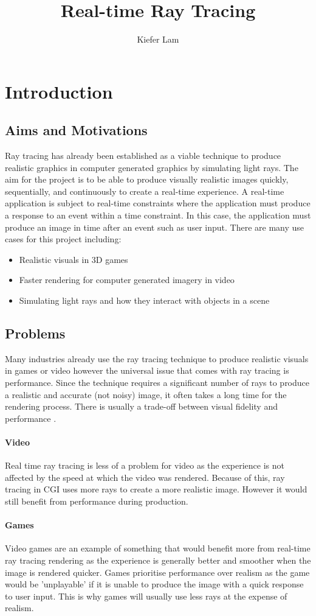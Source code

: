 \documentclass[final]{cmpreport}
\title{Real-time Ray Tracing}
\author{Kiefer Lam}
\begin{document}
\section{Introduction}

\subsection{Aims and Motivations}
Ray tracing has already been established as a viable technique to produce realistic graphics in computer generated graphics by simulating light rays. The aim for the project is to be able to produce visually realistic images quickly, sequentially, and continuously to create a real-time experience. A real-time application is subject to real-time constraints where the application must produce a response to an event within a time constraint. In this case, the application must produce an image in time after an event such as user input. There are many use cases for this project including:

\begin{itemize}
    \item Realistic visuals in 3D games
    \item Faster rendering for computer generated imagery in video
    \item Simulating light rays and how they interact with objects in a scene
\end{itemize}

\subsection{Problems}
Many industries already use the ray tracing technique to produce realistic visuals in games or video however the universal issue that comes with ray tracing is performance. Since the technique requires a significant number of rays to produce a realistic and accurate (not noisy) image, it often takes a long time for the rendering process. There is usually a trade-off between visual fidelity and performance \citep{RTPerfEnergyCost}. 
\paragraph{Video}
Real time ray tracing is less of a problem for video as the experience is not affected by the speed at which the video was rendered. Because of this, ray tracing in CGI uses more rays to create a more realistic image. However it would still benefit from performance during production. 
\paragraph{Games}
Video games are an example of something that would benefit more from real-time ray tracing rendering as the experience is generally better and smoother when the image is rendered quicker. Games prioritise performance over realism as the game would be 'unplayable' if it is unable to produce the image with a quick response to user input. This is why games will usually use less rays at the expense of realism.
\end{document}
